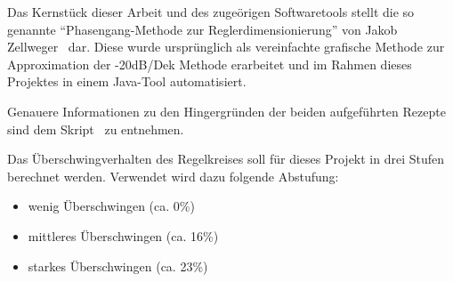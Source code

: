 Das  Kernst\"uck  dieser  Arbeit  und des  zuge\"origen  Softwaretools  stellt
die   so  genannte   ``Phasengang-Methode   zur  Reglerdimensionierung''   von
Jakob   Zellweger~\cite{regelungstechnik:zellweger_short}   dar. Diese   wurde
urspr\"unglich  als  vereinfachte  grafische  Methode  zur  Approximation  der
-20dB/Dek Methode erarbeitet und im Rahmen dieses Projektes in einem Java-Tool
automatisiert.

Genauere  Informationen  zu  den  Hingergr\"unden  der  beiden  aufgef\"uhrten
Rezepte sind dem Skript~\cite{regelungstechnik:zellweger_short} zu entnehmen.

Das \"Uberschwingverhalten des Regelkreises soll  f\"ur dieses Projekt in drei
Stufen  berechnet werden. Verwendet  wird dazu  folgende Abstufung:  


\begin{itemize}
    \item
        wenig \"Uberschwingen (ca. 0\%)
    \item
        mittleres \"Uberschwingen (ca. 16\%)
    \item
        starkes \"Uberschwingen (ca. 23\%)
\end{itemize}


